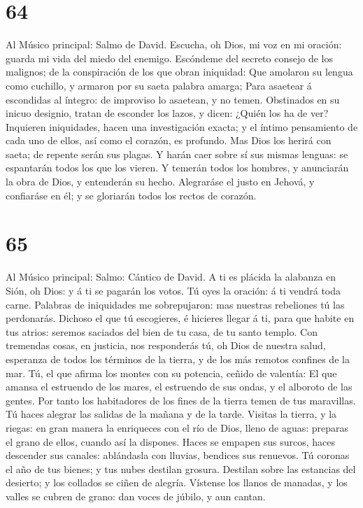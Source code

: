 \hypertarget{section-63}{%
\section{64}\label{section-63}}

 Al Músico principal: Salmo de David. Escucha, oh Dios, mi
voz en mi oración: guarda mi vida del miedo del enemigo. 
Escóndeme del secreto consejo de los malignos; de la conspiración de los
que obran iniquidad:  Que amolaron su lengua como
cuchillo, y armaron por su saeta palabra amarga;  Para
asaetear á escondidas al íntegro: de improviso lo asaetean, y no temen.
 Obstinados en su inicuo designio, tratan de esconder los
lazos, y dicen: ¿Quién los ha de ver?  Inquieren
iniquidades, hacen una investigación exacta; y el íntimo pensamiento de
cada uno de ellos, así como el corazón, es profundo.  Mas
Dios los herirá con saeta; de repente serán sus plagas.  Y
harán caer sobre sí sus mismas lenguas: se espantarán todos los que los
vieren.  Y temerán todos los hombres, y anunciarán la obra
de Dios, y entenderán su hecho.  Alegraráse el justo en
Jehová, y confiaráse en él; y se gloriarán todos los rectos de corazón.

\hypertarget{section-64}{%
\section{65}\label{section-64}}

 Al Músico principal: Salmo: Cántico de David. A ti es
plácida la alabanza en Sión, oh Dios: y á ti se pagarán los votos.
 Tú oyes la oración: á ti vendrá toda carne.
 Palabras de iniquidades me sobrepujaron: mas nuestras
rebeliones tú las perdonarás.  Dichoso el que tú
escogieres, é hicieres llegar á ti, para que habite en tus atrios:
seremos saciados del bien de tu casa, de tu santo templo. 
Con tremendas cosas, en justicia, nos responderás tú, oh Dios de nuestra
salud, esperanza de todos los términos de la tierra, y de los más
remotos confines de la mar.  Tú, el que afirma los montes
con su potencia, ceñido de valentía:  El que amansa el
estruendo de los mares, el estruendo de sus ondas, y el alboroto de las
gentes.  Por tanto los habitadores de los fines de la
tierra temen de tus maravillas. Tú haces alegrar las salidas de la
mañana y de la tarde.  Visitas la tierra, y la riegas: en
gran manera la enriqueces con el río de Dios, lleno de aguas: preparas
el grano de ellos, cuando así la dispones.  Haces se
empapen sus surcos, haces descender sus canales: ablándasla con lluvias,
bendices sus renuevos.  Tú coronas el año de tus bienes;
y tus nubes destilan grosura.  Destilan sobre las
estancias del desierto; y los collados se ciñen de alegría.
 Vístense los llanos de manadas, y los valles se cubren
de grano: dan voces de júbilo, y aun cantan.

